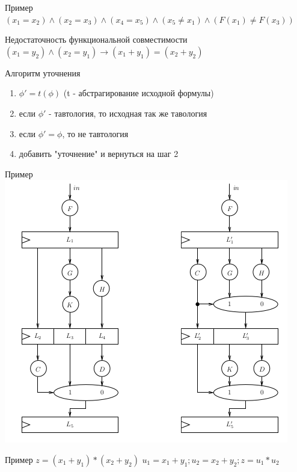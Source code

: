 \documentclass{beamer}
\begin{document}
\begin{frame}{Пример}
$(x_1 = x_2) \wedge (x_2 = x_3) \wedge (x_4 = x_5) \wedge (x_5 \neq x_1) \wedge (F(x_1) \neq F(x_3))$
\end{frame}

\begin{frame}{Недостаточность функциональной совместимости}
$(x_1 = y_2) \wedge (x_2 = y_1) \rightarrow (x_1 + y_1) = (x_2 + y_2)$
\end{frame}

\begin{frame}{Алгоритм уточнения}
\begin{enumerate}
\item $\phi' = t(\phi)$ (t - абстрагирование исходной формулы)
\item если $\phi'$ - тавтология, то исходная так же тавология
\item если $\phi' = \phi$, то не тавтология
\item добавить "уточнение" и вернуться на шаг 2
\end{enumerate}
\end{frame}

\begin{frame}{Пример}
\includegraphics[scale=0.5]{circuit.png}
\end{frame}

\begin{frame}{Пример}
$z = (x_1 + y_1) * (x_2 + y_2)$\newline
$u_1 = x_1 + y_1; u_2 = x_2 + y_2; z = u_1 * u_2$
\end{frame}
\end{document}
